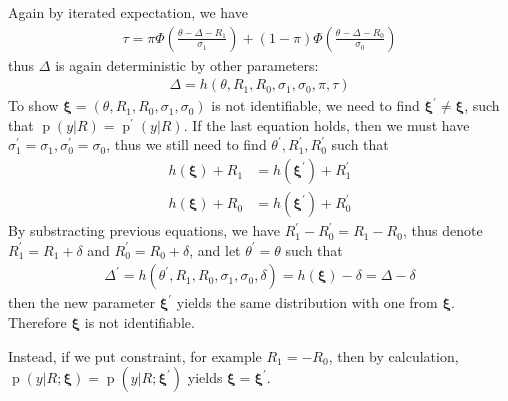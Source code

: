 \documentclass[12pt]{article}
\DeclareMathOperator{\pr}{p}
\begin{document}
Again by iterated expectation, we have
\begin{align*}
  \tau = \pi \Phi \left( \frac{\theta - \Delta - R_1}{\sigma_1}
  \right) + (1 - \pi) \Phi \left( \frac{\theta - \Delta -
      R_0}{\sigma_0} \right)
\end{align*}
thus $\Delta$ is again deterministic by other parameters:
\begin{align*}
  \Delta = h(\theta, R_1, R_0, \sigma_1, \sigma_0 , \pi, \tau)
\end{align*}
To show $\bm \xi = (\theta, R_1, R_0, \sigma_1, \sigma_0)$ is not
identifiable, we need to find $\bm \xi^{'} \neq \bm \xi$, such that
$\pr(y|R) = \pr^{'}(y|R)$. If the last equation holds, then we must
have $\sigma_1^{'} = \sigma_1, \sigma_0^{'} = \sigma_0$, thus we still
need to find $\theta^{'} , R_1^{'}, R_0^{'}$ such that
\begin{align*}
  h(\bm \xi) + R_1 & = h(\bm \xi^{'}) + R_1^{'} \\
  h(\bm \xi) + R_0 & = h(\bm \xi^{'}) + R_0^{'}
\end{align*}
By substracting previous equations, we have $R_1^{'}- R_0^{'} = R_1-
R_0$, thus denote $R_1^{'} = R_1 + \delta$ and $R_0^{'} = R_0 +
\delta$, and let $\theta^{'} = \theta$ such that
\begin{align*}
  \Delta^{'} = h(\theta^{'}, R_1, R_0, \sigma_1, \sigma_0, \delta) =
  h(\bm \xi) - \delta = \Delta - \delta
\end{align*}
then the new parameter $\bm \xi^{'}$ yields the same distribution with
one from $\bm \xi$. Therefore $\bm \xi$ is not identifiable.

Instead, if we put constraint, for example $R_1 = -R_0$, then by
calculation, $\pr(y|R;\bm \xi) = \pr(y|R; \bm \xi^{'})$ yields $\bm
\xi = \bm \xi^{'}$.
\end{document}
